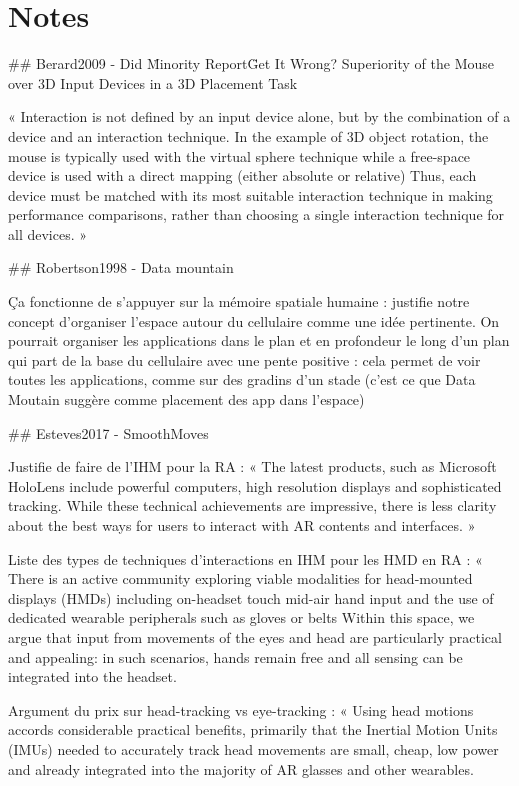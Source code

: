 \chapter{Notes}

## Berard2009 - Did \"Minority Report\" Get It Wrong? Superiority of the Mouse over 3D Input Devices in a 3D Placement Task

« Interaction is not defined by an input device alone, but by the combination of a device and an interaction technique. In the example of 3D object rotation, the mouse is typically used with the virtual sphere technique while a free-space device is used with a direct mapping (either absolute or relative) Thus, each device must be matched with its most suitable interaction technique in making performance comparisons, rather than choosing a single interaction technique for all devices. »

## Robertson1998 - Data mountain

Ça fonctionne de s'appuyer sur la mémoire spatiale humaine : justifie notre concept d'organiser l'espace autour du cellulaire comme une idée pertinente. On pourrait organiser les applications dans le plan et en profondeur le long d'un plan qui part de la base du cellulaire avec une pente positive : cela permet de voir toutes les applications, comme sur des gradins d'un stade (c'est ce que Data Moutain suggère comme placement des app dans l'espace)

## Esteves2017 - SmoothMoves

Justifie de faire de l'IHM pour la RA : « The latest products, such as Microsoft HoloLens include powerful computers, high resolution displays and sophisticated tracking. While these technical achievements are impressive, there is less clarity about the best ways for users to interact with AR contents and interfaces. »

Liste des types de techniques d'interactions en IHM pour les HMD en RA : « There is an active community exploring viable modalities for head-mounted displays (HMDs) including on-headset touch mid-air hand input and the use of dedicated wearable peripherals such as gloves or belts Within this space, we argue that input from movements of the eyes and head are particularly practical and appealing: in such scenarios, hands remain free and all sensing can be integrated into the headset.

Argument du prix sur head-tracking vs eye-tracking : « Using head motions accords considerable practical benefits, primarily that the Inertial Motion Units (IMUs) needed to accurately track head movements are small, cheap, low power and already integrated into the majority of AR glasses and other wearables.

